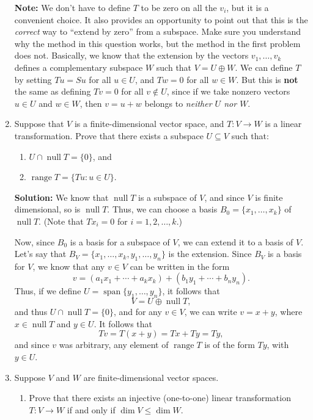 \documentclass[letterpaper,12pt]{article}
\DeclareMathOperator{\nul}{null}
\DeclareMathOperator{\range}{range}
\DeclareMathOperator{\spn}{span}
\begin{document}
\begin{enumerate}
\bigskip

{\bf Note:} We don't have to define $T$ to be zero on all the $v_i$, but it is a convenient choice. It also provides an opportunity to point out that this is the {\em correct} way to ``extend by zero'' from a subspace. Make sure you understand why the method in this question works, but the method in the first problem does not. Basically, we know that the extension by the vectors $v_1,\ldots, v_k$ defines a complementary subspace $W$ such that $V=U\oplus W$. We can define $T$ by setting $Tu=Su$ for all $u\in U$, and $Tw=0$ for all $w\in W$. But this is {\bf not} the same as defining $Tv=0$ for all $v\notin U$, since if we take nonzero vectors $u\in U$ and $w\in W$, then $v=u+w$ belongs to {\em neither $U$ nor $W$}.

\bigskip

 \item Suppose that $V$ is a finite-dimensional vector space, and $T:V\to W$ is a linear transformation. Prove that there exists a subspace $U\subseteq V$ such that:
\begin{enumerate}
 \item $U\cap \nul T = \{0\}$, and
 \item $\range T = \{Tu : u\in U\}$.
\end{enumerate}

\bigskip

{\bf Solution:} We know that $\nul T$ is a subspace of $V$, and since $V$ is finite dimensional, so is $\nul T$. Thus, we can choose a basis $B_0 = \{x_1,\ldots, x_k\}$ of $\nul T$. (Note that $Tx_i=0$ for $i=1,2,\ldots, k$.)

Now, since $B_0$ is a basis for a subspace of $V$, we can extend it to a basis of $V$. Let's say that $B_V = \{x_1,\ldots, x_k,y_1,\ldots, y_n\}$ is the extension. Since $B_V$ is a basis for $V$, we know that any $v\in V$ can be written in the form
\[
 v = (a_1x_1+\cdots + a_kx_k)+(b_1y_1+\cdots +b_ny_n).
\]
Thus, if we define $U = \spn\{y_1,\ldots, y_n\}$, it follows that
\[
 V = U\oplus \nul T,
\]
and thus $U\cap \nul T = \{0\}$, and for any $v\in V$, we can write $v = x+y$, where $x\in \nul T$ and $y\in U$. It follows that
\[
 Tv = T(x+y) = Tx+Ty = Ty,
\]
and since $v$ was arbitrary, any element of $\range T$ is of the form $Ty$, with $y\in U$.

\bigskip

\item Suppose $V$ and $W$ are finite-dimensional vector spaces. 
\begin{enumerate}
\item Prove that there exists an injective (one-to-one) linear transformation $T:V\to W$ if and only if $\dim V\leq \dim W$.


\end{enumerate}
\end{enumerate}
\end{document}
